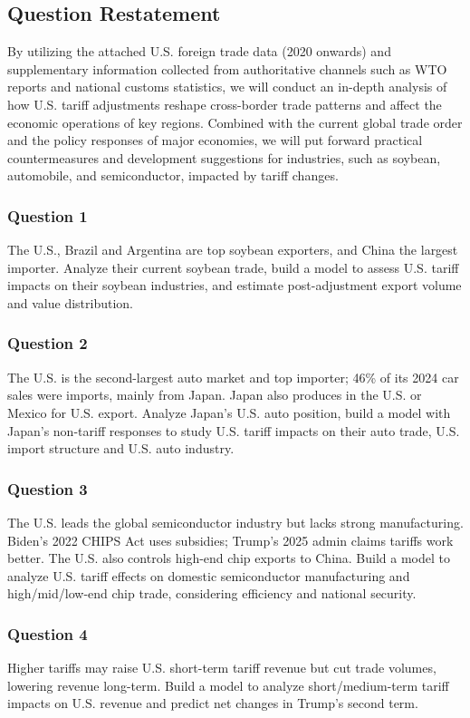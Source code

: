 \documentclass{apmcmthesis}
\begin{document}
\subsection{Question Restatement}
By utilizing the attached U.S. foreign trade data (2020 onwards) and supplementary information collected from authoritative channels such as WTO reports and national customs statistics, we will conduct an in-depth analysis of how U.S. tariff adjustments reshape cross-border trade patterns and affect the economic operations of key regions. Combined with the current global trade order and the policy responses of major economies, we will put forward practical countermeasures and development suggestions for industries, such as soybean, automobile, and semiconductor, impacted by tariff changes.

\subsubsection{Question 1}
The U.S., Brazil and Argentina are top soybean exporters, and China the largest importer. Analyze their current soybean trade, build a model to assess U.S. tariff impacts on their soybean industries, and estimate post-adjustment export volume and value distribution.

\subsubsection{Question 2}
The U.S. is the second-largest auto market and top importer; 46\% of its 2024 car sales were imports, mainly from Japan. Japan also produces in the U.S. or Mexico for U.S. export. Analyze Japan’s U.S. auto position, build a model with Japan’s non-tariff responses to study U.S. tariff impacts on their auto trade, U.S. import structure and U.S. auto industry.

\subsubsection{Question 3}
The U.S. leads the global semiconductor industry but lacks strong manufacturing. Biden’s 2022 CHIPS Act uses subsidies; Trump’s 2025 admin claims tariffs work better. The U.S. also controls high-end chip exports to China. Build a model to analyze U.S. tariff effects on domestic semiconductor manufacturing and high/mid/low-end chip trade, considering efficiency and national security.

\subsubsection{Question 4}
Higher tariffs may raise U.S. short-term tariff revenue but cut trade volumes, lowering revenue long-term. Build a model to analyze short/medium-term tariff impacts on U.S. revenue and predict net changes in Trump’s second term.
\end{document}
